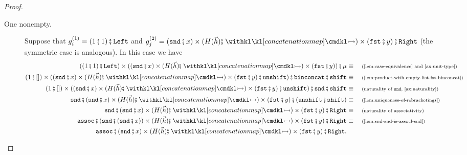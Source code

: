 \begin{proof}
\begin{description}
\begin{description}
            \item[One nonempty.] Suppose that $g^{(1)}_i = (1 \comp 1) \comp \leftterm$ and $g^{(2)}_j = (\sndterm\comp{}x) \times (H(\vec h) \comp \concmap) \times (\fstterm\comp{}y) \comp \rightterm$ (the symmetric case is analogous). In this case we have 
            \begin{align*} 
                ((1 \comp 1) \comp \leftterm) \times ((\sndterm\comp{}x) \times (H(\vec h) \comp \concmap) \times (\fstterm\comp{}y)) \comp \mu \equalbecause{\cref{lem:case-equivalence} and \cref{ax:unit-type}} \\ 
                (1 \comp []) \times ((\sndterm\comp{}x) \times (H(\vec h) \comp \concmap) \times (\fstterm\comp{}y) \comp \unshiftterm) \comp\binconcatterm \comp \shiftterm \equalbecause{\cref{lem:product-with-empty-list-fst-binconcat}} \\ 
                (1 \comp []) \times ((\sndterm\comp{}x) \times (H(\vec h) \comp \concmap) \times (\fstterm\comp{}y) \comp \unshiftterm) \comp \sndterm \comp \shiftterm \equalbecause{naturality of $\sndterm$, \cref{ax:naturality}} \\ 
                \sndterm \comp (\sndterm\comp{}x) \times (H(\vec h) \comp \concmap) \times (\fstterm\comp{}y) \comp (\unshiftterm \comp \shiftterm) \equalbecause{\cref{lem:uniqueness-of-rebracketings}} \\
                \sndterm \comp (\sndterm\comp{}x) \times (H(\vec h) \comp \concmap) \times (\fstterm\comp{}y) \comp \rightterm \equalbecause{naturality of associativity} \\ 
                \assoc \comp (\sndterm \comp (\sndterm\comp{}x)) \times (H(\vec h) \comp \concmap) \times (\fstterm\comp{}y) \comp \rightterm \equalbecause{\cref{lem:snd-snd-is-assocl-snd}} \\ 
                \assoc \comp (\sndterm\comp{}x) \times (H(\vec h) \comp \concmap) \times (\fstterm\comp{}y) \comp \rightterm.
            \end{align*}


\end{description}
\end{description}
\end{proof}
